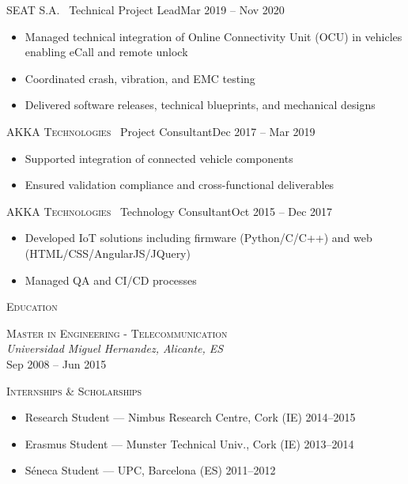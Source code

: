 \documentclass[11pt, a4paper]{article}
\newcommand{\headright}[1]{\vspace*{2ex}\textsc{\large\color{cvblue}#1}\par%
  \vspace*{-1.4ex}{\color{cvblue}\hrulefill}\par}
\newlength{\SideBarW}
\newlength{\TitleBulletGap}     %
\newlength{\BetweenJobsGap}     %
\newenvironment{job}[3]{%
  \vspace{\BetweenJobsGap}%
  \noindent\textsc{#1} \textemdash\ #2\hfill #3\\[-\TitleBulletGap]%
  \begin{itemize}[leftmargin=1.4em,label=--,labelsep=0.5em,itemsep=0.45ex,topsep=0.2ex]
}{%
  \end{itemize}%
}
\begin{document}
\begin{minipage}{\textwidth}
\begin{minipage}[t]{\dimexpr\textwidth-\SideBarW-3mm\relax}
  \begin{job}{SEAT S.A.}{Technical Project Lead}{Mar 2019 -- Nov 2020}
    \item Managed technical integration of Online Connectivity Unit (OCU) in vehicles enabling eCall and remote unlock
    \item Coordinated crash, vibration, and EMC testing
    \item Delivered software releases, technical blueprints, and mechanical designs
  \end{job}

  \begin{job}{AKKA Technologies}{Project Consultant}{Dec 2017 -- Mar 2019}
    \item Supported integration of connected vehicle components
    \item Ensured validation compliance and cross-functional deliverables
  \end{job}

  \begin{job}{AKKA Technologies}{Technology Consultant}{Oct 2015 -- Dec 2017}
    \item Developed IoT solutions including firmware (Python/C/C++) and web (HTML/CSS/AngularJS/JQuery)
    \item Managed QA and CI/CD processes
  \end{job}

  \headright{Education}
  \noindent\textsc{Master in Engineering - Telecommunication} \\
  \textit{Universidad Miguel Hernandez, Alicante, ES} \\
  Sep 2008 -- Jun 2015

  \headright{Internships \& Scholarships}
  \begin{itemize}[leftmargin=1.2em,label=--,labelsep=0.5em,itemsep=0.4ex,topsep=0.2ex]
    \item Research Student --- Nimbus Research Centre, Cork (IE) \hfill 2014--2015
    \item Erasmus Student --- Munster Technical Univ., Cork (IE) \hfill 2013--2014
    \item Séneca Student --- UPC, Barcelona (ES) \hfill 2011--2012
  \end{itemize}
\end{minipage}
\end{minipage}
\end{document}

